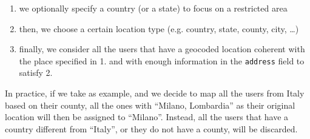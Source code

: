 \begin{enumerate}
	\item we optionally specify a country (or a state) to focus on a restricted area
	\item then, we choose a certain location type (e.g. country, state, county, city, \ldots)
	\item finally, we consider all the users that have a geocoded location coherent with the place specified in 1. and with enough information in the \texttt{address} field to satisfy 2.
\end{enumerate}

In practice, if we take  as example, and we decide to map all the users from Italy based on their county, all the ones with “Milano, Lombardia” as their original location will then be assigned to “Milano”. Instead, all the users that have a country different from “Italy”, or they do not have a county, will be discarded.